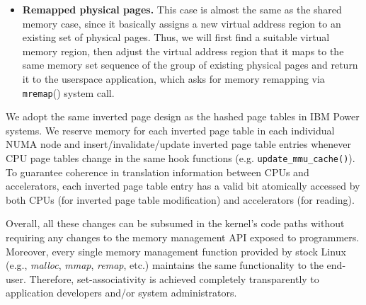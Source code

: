 \begin{itemize}
  \item \textbf{Remapped physical pages.} This case is almost the same as the shared memory case, 
  since it basically assigns a new virtual address region to an existing set of physical pages. 
  Thus, we will first find a suitable virtual memory region, then adjust the virtual address region
  that it maps to the same memory set sequence of the group of existing physical pages and return
  it to the userspace application, which asks for memory remapping via \verb|mremap|() system call.

\end{itemize}


\vspace{2mm}
 We adopt the same inverted
page design as the hashed page tables in IBM Power systems. We reserve
memory for each inverted page table in each individual NUMA node and
insert/invalidate/update inverted page table entries whenever CPU page
tables change in the same hook functions
(e.g. \verb|update_mmu_cache()|). To guarantee coherence in
translation information between CPUs and accelerators, each inverted
page table entry has a valid bit atomically accessed by both CPUs (for
inverted page table modification) and accelerators (for
reading). 

\vspace{2mm}{\noindent \bf Summary:} Overall, all these changes can be
subsumed in the kernel's code paths without requiring any changes to
the memory management API exposed to programmers. Moreover, every
single memory management function provided by stock Linux (e.g., {\it
  malloc}, {\it mmap}, {\it remap}, etc.) maintains the same
functionality to the end-user. Therefore, set-associativity is
achieved completely transparently to application developers and/or
system administrators.


